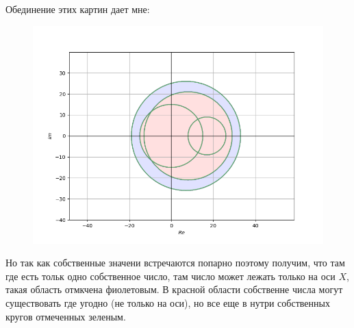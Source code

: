 Обединение этих картин дает мне:

\begin{figure}[H]
    \centering
    \includegraphics[trim={0 0 0 0},clip,width=\textwidth]{Imgs/bool_and.png}
    \label{and}
\end{figure}

Но так как собственные значени встречаются попарно поэтому получим, что там где 
есть тольк одно собственное число, там число может лежать только на оси $X$, такая область
отмкчена фиолетовым. В красной области собственне числа могут существовать где угодно (не только на оси),
но все еще в нутри собственных кругов отмеченных зеленым.



